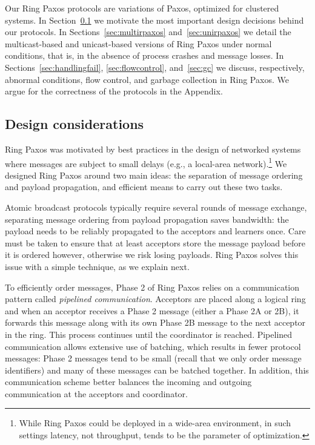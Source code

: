 \documentclass[final,3p,times,twocolumn,authoryear]{elsarticle}
\begin{document}
Our Ring Paxos protocols are variations of Paxos, optimized for clustered systems. 
In Section~\ref{sec:perfcons} we motivate the most important design decisions behind our protocols.
In Sections~\ref{sec:multirpaxos} and~\ref{sec:unirpaxos} we detail the multicast-based and unicast-based versions of Ring Paxos under normal conditions, that is, in the absence of process crashes and message losses. 
In Sections~\ref{sec:handlingfail}, \ref{sec:flowcontrol}, and~\ref{sec:gc} we discuss, respectively, abnormal conditions, flow control, and garbage collection in Ring Paxos. We argue for the correctness of the protocols in the Appendix.


\subsection{Design considerations}
\label{sec:perfcons}
Ring Paxos was motivated by best practices in the design of networked systems where messages are subject to small delays (e.g., a local-area network).\footnote{While Ring Paxos could be deployed in a wide-area environment, in such settings latency, not throughput, tends to be the parameter of optimization.}
We designed Ring Paxos around two main ideas: the separation of message ordering and payload propagation, and  efficient means to carry out these two tasks.  


Atomic broadcast protocols typically require several rounds of message exchange, separating message ordering from payload propagation saves bandwidth: the payload needs to be reliably propagated to the acceptors and learners once.  Care must be taken to ensure that at least  acceptors store the message payload before it is ordered however, otherwise we risk losing payloads.  Ring Paxos solves this issue with a simple technique, as we explain next.

To efficiently order messages, Phase 2 of Ring Paxos relies on a communication pattern called {\it pipelined communication}. 
Acceptors are placed along a logical ring and when an acceptor receives a Phase 2 message (either a Phase 2A or 2B), it forwards this message along with its own Phase 2B message to the next acceptor in the ring.
This process continues until the coordinator is reached.
Pipelined communication allows extensive use of batching, which results in fewer protocol messages: Phase 2 messages tend to be small (recall that we only order message identifiers) and many of these messages can be batched together.
In addition, this communication scheme better balances the incoming and outgoing communication at the acceptors and coordinator.
\end{document}
